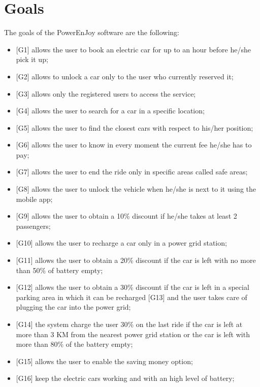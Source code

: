 \section{Goals}
The goals of the PowerEnJoy software are the following:
\begin{itemize}
	\item {[G1]} allows the user to book an electric car for up to an hour before he/she pick it up;
	\item {[G2]} allows to unlock a car only to the user who currently reserved it;
	\item {[G3]} allows only the registered users to access the service;
	\item {[G4]} allows the user to search for a car in a specific location; 
	\item {[G5]} allows the user to find the closest cars with respect to his/her position; 
	\item {[G6]} allows the user to know in every moment the current fee he/she has to pay;
	\item {[G7]} allows the user to end the ride only in specific areas called safe areas;
	\item {[G8]} allows the user to unlock the vehicle when he/she is next to it using the mobile app;
	\item {[G9]} allows the user to obtain a 10\% discount if he/she takes at least 2 passengers;
	\item {[G10]} allows the user to recharge a car only in a power grid station;
	\item {[G11]} allows the user to obtain a 20\% discount if the car is left with no more than 50\% of battery empty;
	\item {[G12]} allows the user to obtain a 30\% discount if the car is left in a special parking area in which it can be recharged {[G13]} and the user takes care of plugging the car into the power grid;
	\item {[G14]} the system charge the user 30\% on the last ride if the car is left at more than 3 KM from the nearest power grid station or the car is left with more than 80\% of the battery empty;
	\item {[G15]} allows the user to enable the saving money option;
	\item {[G16]} keep the electric cars working and with an high level of battery;
	
\end{itemize}

